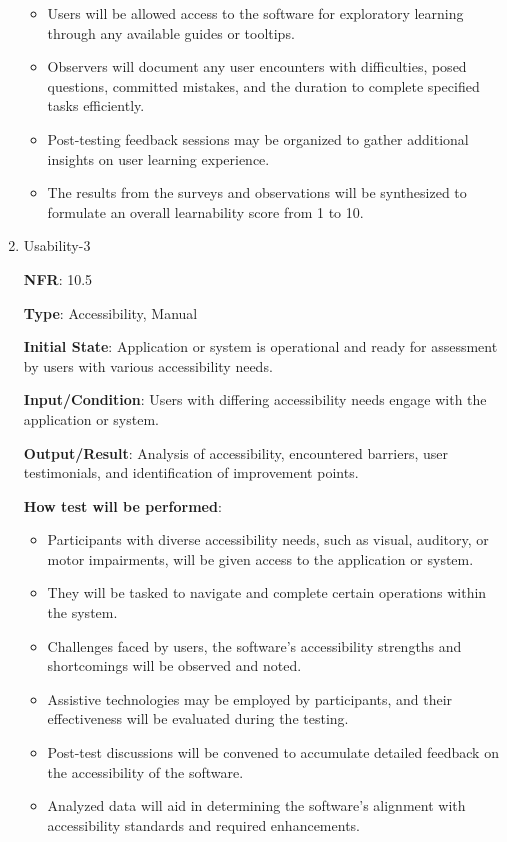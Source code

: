 \documentclass[12pt, titlepage]{article}
\begin{document}
\begin{enumerate}
\begin{itemize}
    \item Users will be allowed access to the software for exploratory learning through any available guides or tooltips.
    \item Observers will document any user encounters with difficulties, posed questions, committed mistakes, and the duration to complete specified tasks efficiently.
    \item Post-testing feedback sessions may be organized to gather additional insights on user learning experience.
    \item The results from the surveys and observations will be synthesized to formulate an overall learnability score from 1 to 10.
\end{itemize}

\item{Usability-3\\}

\textbf{NFR}: 10.5

\textbf{Type}: Accessibility, Manual

\textbf{Initial State}: Application or system is operational and ready for assessment by users with various accessibility needs.

\textbf{Input/Condition}: Users with differing accessibility needs engage with the application or system.

\textbf{Output/Result}: Analysis of accessibility, encountered barriers, user testimonials, and identification of improvement points.

\textbf{How test will be performed}:

\begin{itemize}
    \item Participants with diverse accessibility needs, such as visual, auditory, or motor impairments, will be given access to the application or system.
    \item They will be tasked to navigate and complete certain operations within the system.
    \item Challenges faced by users, the software's accessibility strengths and shortcomings will be observed and noted.
    \item Assistive technologies may be employed by participants, and their effectiveness will be evaluated during the testing.
    \item Post-test discussions will be convened to accumulate detailed feedback on the accessibility of the software.
    \item Analyzed data will aid in determining the software's alignment with accessibility standards and required enhancements.
\end{itemize}

\end{enumerate}
\end{document}
